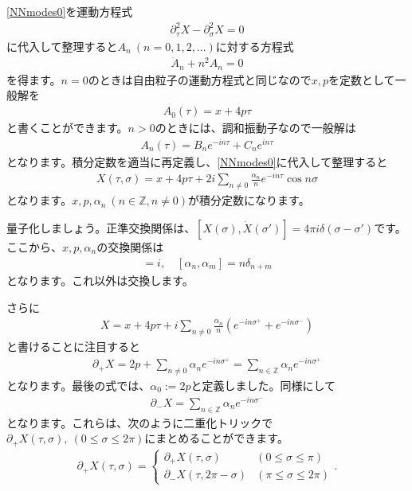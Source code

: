 \documentclass[report,paper=a4, fontsize=12pt, line_length=16cm, number_of_lines=34,dvipdfmx]{jlreq}
\numberwithin{equation}{chapter}
\numberwithin{equation}{section}
\newcommand{\Zb}{\mathbb{Z}}
\newcommand{\del}{\partial}
\begin{document}
\eqref{NNmodes0}を運動方程式
\begin{align}
  \del_{\tau}^2X-\del_{\sigma}^2X=0
\end{align}
に代入して整理すると$A_n\ (n=0,1,2,\dots)$に対する方程式
\begin{align}
  \ddot{A}_{n}+n^2 A_n=0
\end{align}
を得ます。$n=0$のときは自由粒子の運動方程式と同じなので$x,p$を定数として一般解を
\begin{align}
  A_{0}(\tau)=x+4p\tau
\end{align}
と書くことができます。$n>0$のときには、調和振動子なので一般解は
\begin{align}
  A_{n}(\tau)=B_{n}e^{-in\tau}+C_{n}e^{in\tau}
\end{align}
となります。積分定数を適当に再定義し、\eqref{NNmodes0}に代入して整理すると
\begin{align}
  X(\tau,\sigma)=x+4p\tau+2i\sum_{n\ne 0}
  \frac{\alpha_{n}}{n}e^{-in\tau}\cos n\sigma
\end{align}
となります。$x,p,\alpha_{n}\ (n\in \Zb, n \ne 0)$が積分定数になります。

量子化しましょう。正準交換関係は、$[X(\sigma),\dot{X}(\sigma')]=4\pi i \delta(\sigma-\sigma')$です。ここから、$x,p,\alpha_{n}$の交換関係は
\begin{align}
  [x,p]=i,\quad [\alpha_{n},\alpha_{m}]=n\delta_{n+m}
\end{align}
となります。これ以外は交換します。

さらに
\begin{align}
  X=x+4p\tau+i\sum_{n\ne 0}\frac{\alpha_{n}}{n}(e^{-in\sigma^{+}}+e^{-in\sigma^{-}})
\end{align}
と書けることに注目すると
\begin{align}
  \del_{+}X=2p+\sum_{n\ne 0}\alpha_{n}e^{-in\sigma^{+}}
  =\sum_{n\in \Zb}\alpha_{n}e^{-in\sigma^{+}}
\end{align}
となります。最後の式では、$\alpha_{0}:=2p$と定義しました。同様にして
\begin{align}
  \del_{-}X=\sum_{n\in \Zb}\alpha_{n}e^{-in\sigma^{-}}
\end{align}
となります。これらは、次のように二重化トリックで$\del_{+}X(\tau,\sigma),\ (0\le \sigma \le 2\pi)$にまとめることができます。
\begin{align}
  \del_{+}X(\tau,\sigma)=
  \begin{cases}
    \del_{+}X(\tau,\sigma)& (0\le \sigma \le \pi)\\
    \del_{-}X(\tau,2\pi-\sigma) & (\pi\le \sigma \le 2\pi)
  \end{cases}.
\end{align}
\end{document}
